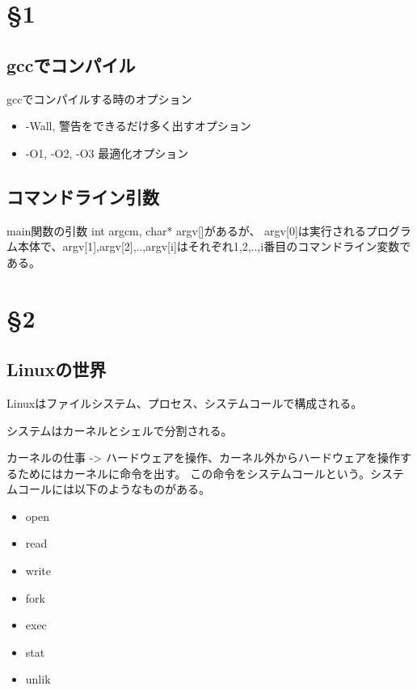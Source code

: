 \section{\S 1}

\subsection{gccでコンパイル}

gccでコンパイルする時のオプション

\begin{itemize}

   \item -Wall, 警告をできるだけ多く出すオプション

   \item -O1, -O2, -O3 最適化オプション

\end{itemize}

\subsection{コマンドライン引数}

main関数の引数 int argcm, char* argv[]があるが、
argv[0]は実行されるプログラム本体で、argv[1],argv[2],..,argv[i]はそれぞれ1,2,..,i番目のコマンドライン変数である。 

\section{\S 2}

\subsection{Linuxの世界}

Linuxはファイルシステム、プロセス、システムコールで構成される。

システムはカーネルとシェルで分割される。

カーネルの仕事 -> ハードウェアを操作、カーネル外からハードウェアを操作するためにはカーネルに命令を出す。
この命令をシステムコールという。システムコールには以下のようなものがある。

\begin{itemize}
  
  \item open
  \item read
  \item write
  \item fork
  \item exec
  \item stat
  \item unlik 

\end{itemize}

